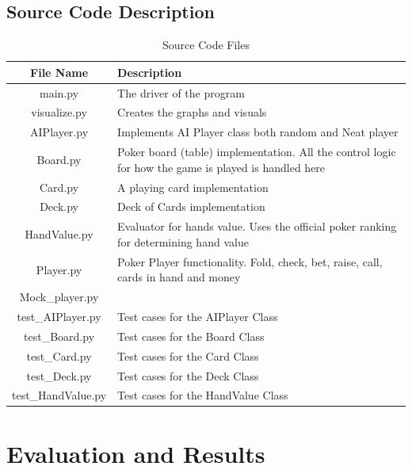 \subsection{Source Code Description}
\begin{table}[H]
    \caption{Source Code Files}
    \centering
    \begin{tabular}{ | c | p{14cm} |}
    \hline
         File Name & Description \\
        \hline
        \hline
        main.py & The driver of the program\\ \hline
        visualize.py & Creates the graphs and visuals\\ \hline
        AIPlayer.py & Implements AI Player class both random and Neat player\\ \hline
        Board.py & Poker board (table) implementation. All the control logic for how the game is played is handled here\\ \hline
        Card.py & A playing card implementation\\ \hline
        Deck.py & Deck of Cards implementation\\ \hline
        HandValue.py & Evaluator for hands value. Uses the official poker ranking for determining hand value\\ \hline
        Player.py & Poker Player functionality. Fold, check, bet, raise, call, cards in hand and money\\
        Mock\_player.py & \\ \hline
        test\_AIPlayer.py & Test cases for the AIPlayer Class \\ \hline
        test\_Board.py & Test cases for the Board Class\\ \hline
        test\_Card.py & Test cases for the Card Class\\ \hline
        test\_Deck.py & Test cases for the Deck Class\\ \hline
        test\_HandValue.py & Test cases for the HandValue Class\\
        
    \hline
    \end{tabular}
    \label{tab:sourceCode}
\end{table}

\section{Evaluation and Results}


